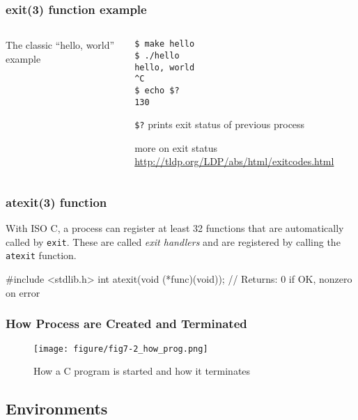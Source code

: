 \documentclass[newPxFont,sthlmFooter,nooffset]{beamer}
\begin{document}
\begin{frame}[containsverbatim,t]
  \frametitle{exit(3) function example}
\bigskip
  \begin{columns}
    \begin{column}{0.45\linewidth}
      The classic ``hello, world'' example
      
    \end{column}
    \begin{column}{0.5\linewidth}
\begin{verbatim}
$ make hello
$ ./hello
hello, world
^C
$ echo $?
130
\end{verbatim}
\texttt{\$?} prints exit status of previous process

      more on exit status
      \url{http://tldp.org/LDP/abs/html/exitcodes.html}
    \end{column}
  \end{columns}
\end{frame}

\begin{frame}[containsverbatim,t]
  \frametitle{atexit(3) function}
With ISO C, a process can register at least 32 functions that are automatically called by
\texttt{exit}. These are called \textit{exit handlers} and are registered by calling the \texttt{atexit} function.

\begin{codedef}
#include <stdlib.h>
int atexit(void (*func)(void));
// Returns: 0 if OK, nonzero on error
\end{codedef}


\end{frame}


\begin{frame}[t]
  \frametitle{How Process are Created and Terminated}

\begin{figure}[h]
  \centering
  \texttt{[image: figure/fig7-2\_how\_prog.png]}
  \caption{How a C program is started and how it terminates}
\end{figure}
\end{frame}





\subsection{Environments}
\end{document}
